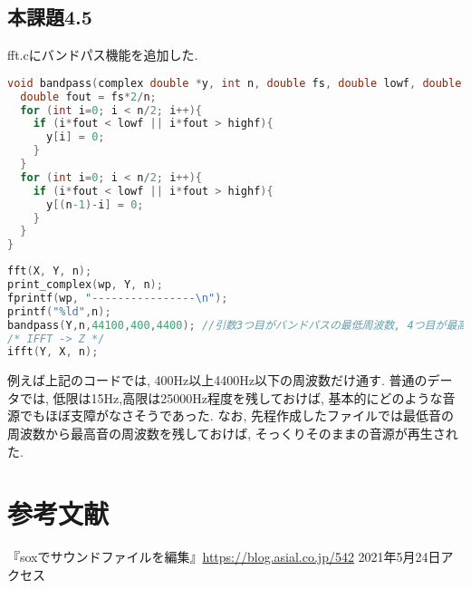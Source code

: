 \documentclass{ltjsarticle}
\begin{document}
\subsection{本課題4.5}
fft.cにバンドパス機能を追加した. 
\begin{lstlisting}[caption=bandpass.c 追加関数1,language=C]
void bandpass(complex double *y, int n, double fs, double lowf, double highf){
  double fout = fs*2/n;
  for (int i=0; i < n/2; i++){
    if (i*fout < lowf || i*fout > highf){
      y[i] = 0;
    }
  }
  for (int i=0; i < n/2; i++){
    if (i*fout < lowf || i*fout > highf){
      y[(n-1)-i] = 0;
    }
  }
}
\end{lstlisting}
\begin{lstlisting}[caption=bandpass.c main関数,language=C]
fft(X, Y, n);
print_complex(wp, Y, n);
fprintf(wp, "----------------\n");
printf("%ld",n);
bandpass(Y,n,44100,400,4400); //引数3つ目がバンドパスの最低周波数, 4つ目が最高周波数である. 
/* IFFT -> Z */
ifft(Y, X, n);
\end{lstlisting}
例えば上記のコードでは, 400Hz以上4400Hz以下の周波数だけ通す. 普通のデータでは, 低限は15Hz,高限は25000Hz程度を残しておけば, 基本的にどのような音源でもほぼ支障がなさそうであった. なお, 先程作成したファイルでは最低音の周波数から最高音の周波数を残しておけば, そっくりそのままの音源が再生された. 

\section{参考文献}
『soxでサウンドファイルを編集』\url{https://blog.asial.co.jp/542} 2021年5月24日アクセス
\end{document}
